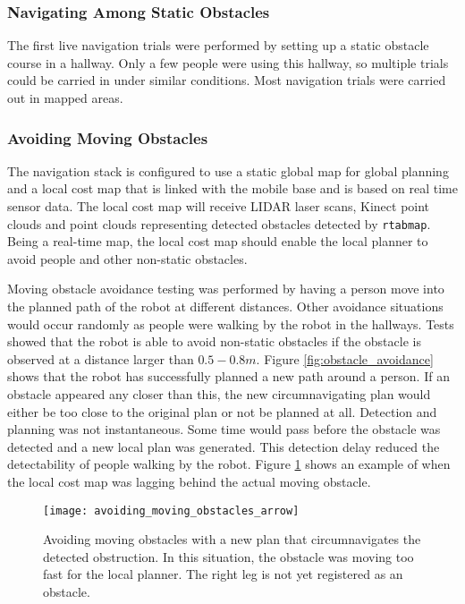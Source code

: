 \subsubsection{Navigating Among Static Obstacles}

The first live navigation trials were performed by setting up a static obstacle course in a hallway. Only a few people were using this hallway, so multiple trials could be carried in under similar conditions. Most navigation trials were carried out in mapped areas.



\subsubsection{Avoiding Moving Obstacles}

The navigation stack is configured to use a static global map for global planning and a local cost map that is linked with the mobile base and is based on real time sensor data. The local cost map will receive LIDAR laser scans, Kinect point clouds and point clouds representing detected obstacles detected by \texttt{rtabmap}. Being a real-time map, the local cost map should enable the local planner to avoid people and other non-static obstacles.

Moving obstacle avoidance testing was performed by having a person move into the planned path of the robot at different distances. Other avoidance situations would occur randomly as people were walking by the robot in the hallways. Tests showed that the robot is able to avoid non-static obstacles if the obstacle is observed at a distance larger than $0.5 - 0.8 m$. Figure \ref{fig:obstacle_avoidance} shows that the robot has successfully planned a new path around a person. If an obstacle appeared any closer than this, the new circumnavigating plan would either be too close to the original plan or not be planned at all. Detection and planning was not instantaneous. Some time would pass before the obstacle was detected and a new local plan was generated. This detection delay reduced the detectability of people walking by the robot. Figure \ref{fig:avoiding_moving_obstacles} shows an example of when the local cost map was lagging behind the actual moving obstacle.



\begin{figure}[p]
	\centering
	\texttt{[image: avoiding\_moving\_obstacles\_arrow]}
	\caption{Avoiding moving obstacles with a new plan that circumnavigates the detected obstruction. In this situation, the obstacle was moving too fast for the local planner. The right leg is not yet registered as an obstacle.}
	\label{fig:avoiding_moving_obstacles}
\end{figure}

